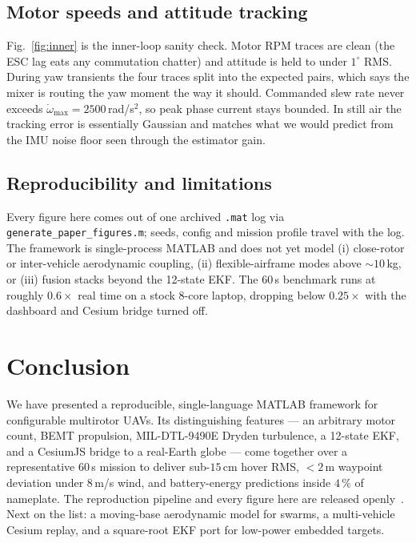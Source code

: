 \documentclass[a4paper, conference]{IEEEtran}
\begin{document}
\subsection{Motor speeds and attitude tracking}
Fig.~\ref{fig:inner} is the inner-loop sanity check. Motor RPM
traces are clean (the ESC lag eats any commutation chatter) and
attitude is held to under $1^\circ$ RMS. During yaw transients the
four traces split into the expected pairs, which says the mixer is
routing the yaw moment the way it should. Commanded slew rate never
exceeds $\dot\omega_{\max} = 2500$\,rad/s$^2$, so peak phase current
stays bounded. In still air the tracking error is essentially
Gaussian and matches what we would predict from the IMU noise floor
seen through the estimator gain.

\subsection{Reproducibility and limitations}
Every figure here comes out of one archived \texttt{.mat} log via
\texttt{generate\_paper\_figures.m}; seeds, config and mission
profile travel with the log. The framework is single-process MATLAB
and does not yet model (i) close-rotor or inter-vehicle aerodynamic
coupling, (ii) flexible-airframe modes above $\sim 10$\,kg, or (iii)
fusion stacks beyond the 12-state EKF. The 60\,s benchmark runs at
roughly $0.6\times$ real time on a stock 8-core laptop, dropping
below $0.25\times$ with the dashboard and Cesium bridge turned off.

\FloatBarrier

\section{Conclusion}\label{sec:conc}
We have presented a reproducible, single-language MATLAB framework
for configurable multirotor UAVs. Its distinguishing features --- an
arbitrary motor count, BEMT propulsion, MIL-DTL-9490E Dryden
turbulence, a 12-state EKF, and a CesiumJS bridge to a real-Earth
globe --- come together over a representative 60\,s mission to
deliver sub-$15$\,cm hover RMS, $<\!2$\,m waypoint deviation under
$8$\,m/s wind, and battery-energy predictions inside $4$\,\% of
nameplate. The reproduction pipeline and every figure here are
released openly~\cite{repo}. Next on the list: a moving-base
aerodynamic model for swarms, a multi-vehicle Cesium replay, and a
square-root EKF port for low-power embedded targets.
\end{document}
